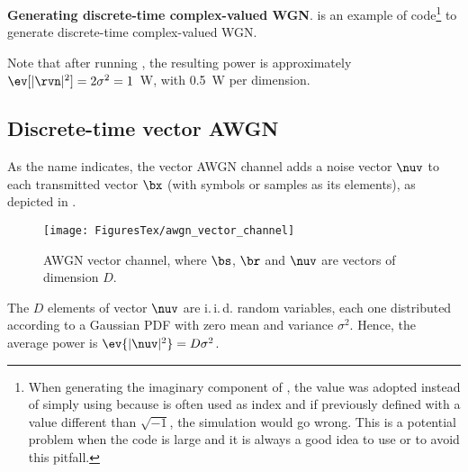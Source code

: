 \bExample \textbf{Generating discrete-time complex-valued WGN}.
 is an example of code\footnote{When generating the imaginary component of , the value  was adopted instead of simply using  because  is often used as index and if previously defined with a value different than $\sqrt{-1}$, the simulation would go wrong. This is a potential problem when the code is large and it is always a good idea to use  or  to avoid this pitfall.} to generate discrete-time complex-valued WGN.

Note that after running , the resulting power is approximately $\ev[|\rvn|^2]=2 \sigma^2 = 1$~W, with 0.5~W per dimension.
\eExample

\subsection{Discrete-time vector AWGN}
\label{sec:vectorAWGNChannel}

As the name indicates, the vector AWGN channel adds a noise vector $\nuv$
to each transmitted vector $\bx$ (with symbols or samples as its elements), as depicted in .

\begin{figure}[htbp]
\centering
\texttt{[image: FiguresTex/awgn\_vector\_channel]}
\caption{AWGN vector channel, where $\bs$, $\br$ and $\nuv$ are vectors of dimension $D$.}
\label{fig:awgn_vector_channel}
\end{figure}

The $D$ elements of vector $\nuv$ are i.\,i.\,d. random variables, each one distributed according to a Gaussian PDF with zero mean and variance $\sigma^2$. Hence, the average power is $\ev\{|\nuv|^2\} = D \sigma^2$.

